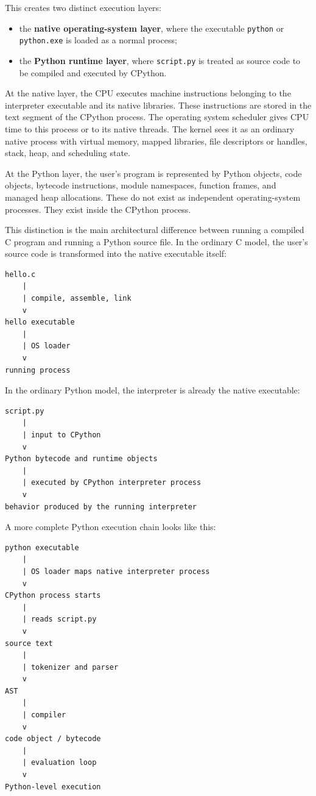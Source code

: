 \documentclass[a4paper,twoside]{report}
\begin{document}
This creates two distinct execution layers:

\begin{itemize}
    \item the \textbf{native operating-system layer}, where the executable \texttt{python} or \texttt{python.exe} is loaded as a normal process;
    \item the \textbf{Python runtime layer}, where \texttt{script.py} is treated as source code to be compiled and executed by CPython.
\end{itemize}

At the native layer, the CPU executes machine instructions belonging to the interpreter executable and its native libraries. These instructions are stored in the text segment of the CPython process. The operating system scheduler gives CPU time to this process or to its native threads. The kernel sees it as an ordinary native process with virtual memory, mapped libraries, file descriptors or handles, stack, heap, and scheduling state.

At the Python layer, the user's program is represented by Python objects, code objects, bytecode instructions, module namespaces, function frames, and managed heap allocations. These do not exist as independent operating-system processes. They exist inside the CPython process.

This distinction is the main architectural difference between running a compiled C program and running a Python source file. In the ordinary C model, the user's source code is transformed into the native executable itself:

\begin{verbatim}
hello.c
    |
    | compile, assemble, link
    v
hello executable
    |
    | OS loader
    v
running process
\end{verbatim}

In the ordinary Python model, the interpreter is already the native executable:

\begin{verbatim}
script.py
    |
    | input to CPython
    v
Python bytecode and runtime objects
    |
    | executed by CPython interpreter process
    v
behavior produced by the running interpreter
\end{verbatim}

A more complete Python execution chain looks like this:

\begin{verbatim}
python executable
    |
    | OS loader maps native interpreter process
    v
CPython process starts
    |
    | reads script.py
    v
source text
    |
    | tokenizer and parser
    v
AST
    |
    | compiler
    v
code object / bytecode
    |
    | evaluation loop
    v
Python-level execution
\end{verbatim}
\end{document}
